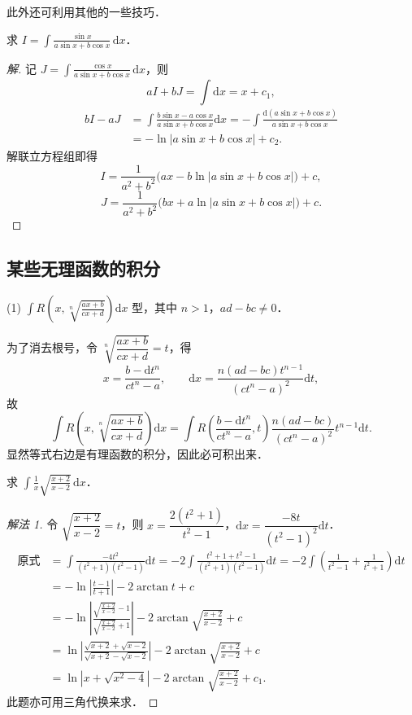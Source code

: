 此外还可利用其他的一些技巧．

\begin{example}\label{ex:6-2-29}
求 $\displaystyle I = \int\frac{\sin x}{a\sin x+b\cos x}\,\mathrm{d}x$．
\end{example}

\begin{proof}[解]
记 $\displaystyle J = \int\frac{\cos x}{a\sin x+b\cos x}\,\mathrm{d}x$，则
\[
aI+bJ = \int\mathrm{d}x = x+c_{1},
\]
\[
\begin{aligned}
bI-aJ &= \int\frac{b\sin x-a\cos x}{a\sin x+b\cos x}\mathrm{d}x
= -\int\frac{\mathrm{d}(a\sin x+b\cos x)}{a\sin x+b\cos x}\\
&= -\ln|a\sin x+b\cos x|+c_{2}.
\end{aligned}
\]
解联立方程组即得
\[
I = \frac{1}{a^{2}+b^{2}}\big(ax-b\ln|a\sin x+b\cos x|\big)+c,
\]
\[
J = \frac{1}{a^{2}+b^{2}}\big(bx+a\ln|a\sin x+b\cos x|\big)+c.
\]
\end{proof}

\subsection{某些无理函数的积分}

(1) $\displaystyle\int R\left(x,\sqrt[n]{\frac{ax+b}{cx+d}}\right)\mathrm{d}x$ 型，其中 $n > 1$，$ad-bc \neq 0$．

为了消去根号，令 $\sqrt[n]{\dfrac{ax+b}{cx+d}} = t$，得
\[
x = \frac{b-\mathrm{d}t^{n}}{ct^{n}-a},\qquad
\mathrm{d}x = \frac{n(ad-bc)t^{n-1}}{\left(ct^{n}-a\right)^{2}}\mathrm{d}t,
\]
故
\[
\int R\left(x,\sqrt[n]{\frac{ax+b}{cx+d}}\right)\mathrm{d}x
= \int R\left(\frac{b-\mathrm{d}t^{n}}{ct^{n}-a},t\right)\frac{n(ad-bc)}{\left(ct^{n}-a\right)^{2}}t^{n-1}\mathrm{d}t.
\]
显然等式右边是有理函数的积分，因此必可积出来．

\begin{example}\label{ex:6-2-30}
求 $\displaystyle\int\frac{1}{x}\sqrt{\frac{x+2}{x-2}}\,\mathrm{d}x$．
\end{example}

\begin{proof}[解法 1]
令 $\sqrt{\dfrac{x+2}{x-2}} = t$，则 $x = \dfrac{2(t^{2}+1)}{t^{2}-1}$，$\mathrm{d}x = \dfrac{-8t}{(t^{2}-1)^{2}}\mathrm{d}t$．
\[
\begin{aligned}
\text{原式} &= \int\frac{-4t^{2}}{\left(t^{2}+1\right)\left(t^{2}-1\right)}\mathrm{d}t
= -2\int\frac{t^{2}+1+t^{2}-1}{\left(t^{2}+1\right)\left(t^{2}-1\right)}\mathrm{d}t
= -2\int\left(\frac{1}{t^{2}-1}+\frac{1}{t^{2}+1}\right)\mathrm{d}t\\
&= -\ln\left|\frac{t-1}{t+1}\right|-2\arctan t+c\\
&= -\ln\left|\frac{\sqrt{\frac{x+2}{x-2}}-1}{\sqrt{\frac{x+2}{x-2}}+1}\right|-2\arctan\sqrt{\frac{x+2}{x-2}}+c\\
&= \ln\left|\frac{\sqrt{x+2}+\sqrt{x-2}}{\sqrt{x+2}-\sqrt{x-2}}\right|-2\arctan\sqrt{\frac{x+2}{x-2}}+c\\
&= \ln\left|x+\sqrt{x^{2}-4}\right|-2\arctan\sqrt{\frac{x+2}{x-2}}+c_{1}.
\end{aligned}
\]
此题亦可用三角代换来求．
\end{proof}

